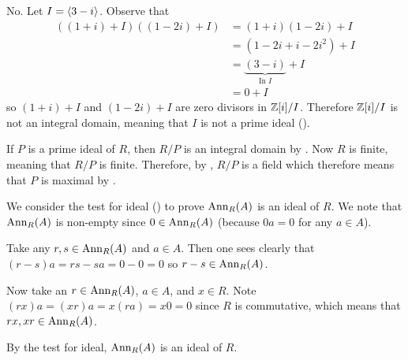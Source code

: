 \begin{questions}
    \item No. Let $I = \left\langle3-i\right\rangle$. Observe that
    \begin{align*}
        ((1+i)+I)((1-2i)+I) &= (1+i)(1-2i) + I\\
        &= (1-2i+i-2i^2) + I\\
        &= \underbrace{(3 - i)}_{\text{In }I} + I\\
        &= 0 + I
    \end{align*}
    so $(1+i)+I$ and $(1-2i)+I$ are zero divisors in $\mathbb{Z}[i]/I$. Therefore $\mathbb{Z}[i]/I$ is not an integral domain, meaning that $I$ is not a prime ideal ().

    \item If $P$ is a prime ideal of $R$, then $R/P$ is an integral domain by . Now $R$ is finite, meaning that $R/P$ is finite. Therefore, by , $R/P$ is a field which therefore means that $P$ is maximal by .

    \item We consider the test for ideal () to prove $\mathrm{Ann}_{R}(A)$ is an ideal of $R$. We note that $\mathrm{Ann}_{R}(A)$ is non-empty since $0 \in \mathrm{Ann}_{R}(A)$ (because $0a = 0$ for any $a \in A$).

    Take any $r, s \in \mathrm{Ann}_{R}(A)$ and $a \in A$. Then one sees clearly that $(r-s)a = rs - sa = 0 - 0 = 0$ so $r-s \in \mathrm{Ann}_{R}(A)$.

    Now take an $r \in \mathrm{Ann}_{R}(A)$, $a \in A$, and $x \in R$. Note $(rx)a = (xr)a = x(ra) = x0 = 0$ since $R$ is commutative, which means that $rx, xr \in \mathrm{Ann}_{R}(A)$.

    By the test for ideal, $\mathrm{Ann}_{R}(A)$ is an ideal of $R$.
\end{questions}

